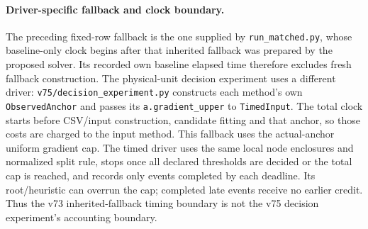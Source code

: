 \paragraph{Driver-specific fallback and clock boundary.}
The preceding fixed-row fallback is the one supplied by \texttt{run\_matched.py}, whose baseline-only clock begins after that inherited fallback was prepared by the proposed solver. Its recorded own baseline elapsed time therefore excludes fresh fallback construction. The physical-unit decision experiment uses a different driver: \texttt{v75/decision\_experiment.py} constructs each method's own \texttt{ObservedAnchor} and passes its \texttt{a.gradient\_upper} to \texttt{TimedInput}. The total clock starts before CSV/input construction, candidate fitting and that anchor, so those costs are charged to the input method. This fallback uses the actual-anchor uniform gradient cap. The timed driver uses the same local node enclosures and normalized split rule, stops once all declared thresholds are decided or the total cap is reached, and records only events completed by each deadline. Its root/heuristic can overrun the cap; completed late events receive no earlier credit. Thus the v73 inherited-fallback timing boundary is not the v75 decision experiment's accounting boundary.
